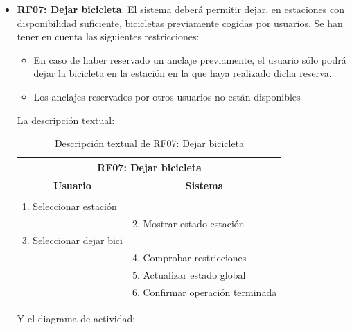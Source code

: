 \begin{itemize}
	\FloatBarrier
	\item \textbf{RF07: Dejar bicicleta}. El sistema deberá permitir dejar, en estaciones con disponibilidad suficiente, bicicletas previamente cogidas por usuarios. Se han tener en cuenta las siguientes restricciones:
	\begin{itemize}
		\item En caso de haber reservado un anclaje previamente, el usuario sólo podrá dejar la bicicleta en la estación en la que haya realizado dicha reserva.
		\item Los anclajes reservados por otros usuarios no están disponibles
	\end{itemize}
	
	La descripción textual:
	
	\begin{table}[h]
		\centering	
		\begin{tabular}{|l|l|}
			\hline
			\multicolumn{2}{|c|}{\textbf{RF07: Dejar bicicleta}} \\ \hline
			\multicolumn{1}{|c|}{\textbf{Usuario}} & \multicolumn{1}{c|}{\textbf{Sistema}} \\ \hline
			[Pto. inclusión: RF02: Loguear usuario] &\\ \hline
			1. Seleccionar estación &\\ \hline
			& 2. Mostrar estado estación \\ \hline
			3. Seleccionar dejar bici &\\ \hline
			& 4. Comprobar restricciones \\ \hline
			& 5. Actualizar estado global \\ \hline
			& 6. Confirmar operación terminada \\ \hline 
		\end{tabular}
		\caption{Descripción textual de RF07: Dejar bicicleta}
		\label{tab:tablaDescTextualRF07}
	\end{table}
	
	\FloatBarrier
	Y el diagrama de actividad:
	

\end{itemize}
